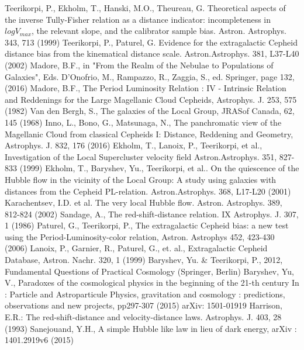 \begin{thebibliography}{}
Teerikorpi, P., Ekholm, T., Hanski, M.O., Theureau, G. Theoretical aspects of the inverse Tully-Fisher relation as a distance indicator: incompleteness in $logV_{max}$, the relevant slope, and the calibrator sample bias. Astron. Astrophys. 343, 713 (1999)
Teerikorpi, P., Paturel, G. Evidence for the extragalactic Cepheid distance bias from the kinematical distance scale. Astron.Astrophys. 381, L37-L40 (2002)
Madore, B.F., in "From the Realm of the Nebulae to Populations of Galaxies", Eds. D'Onofrio, M., Rampazzo, R., Zaggia, S., ed. Springer, page 132, (2016)
Madore, B.F., The Period Luminosity Relation : IV - Intrinsic Relation and Reddenings for the Large Magellanic Cloud Cepheids, Astrophys. J. 253, 575 (1982)
Van den Bergh, S., The galaxies of the Local Group, JRASof Canada, 62, 145 (1968)
Inno, L., Bono, G., Matsunaga, N., The panchromatic view of the Magellanic Cloud from classical Cepheids I: Distance, Reddening and Geometry, Astrophys. J. 832, 176 (2016)
Ekholm, T., Lanoix, P., Teerikorpi, et al., Investigation of the Local Supercluster velocity field Astron.Astrophys. 351, 827-833 (1999)   
Ekholm, T., Baryshev, Yu., Teerikorpi, et al.. On the quiescence of the Hubble flow in the vicinity of the Local Group: A study using galaxies with distances from the Cepheid PL-relation. Astron.Astrophys. 368, L17-L20 (2001)
Karachentsev, I.D. et al. The very local Hubble flow. Astron. Astrophys. 389, 812-824 (2002)
Sandage, A., The red-shift-distance relation. IX Astrophys. J. 307, 1  (1986)
Paturel, G., Teerikorpi, P., The extragalactic Cepheid bias: a new test using the Period-Luminosity-color relation, Astron. Astrophys 452, 423-430 (2006)
Lanoix, P., Garnier, R., Paturel, G., et. al., Extragalactic Cepheid Database, Astron. Nachr. 320, 1 (1999)
Baryshev, Yu. \& Teerikorpi, P., 2012, Fundamental Questions of Practical Cosmology (Springer, Berlin)
 Baryshev, Yu, V., Paradoxes of the cosmological physics in the beginning of the 21-th  century In : Particle and Astroparticule Physics, gravitation and cosmology : predictions, observations and new projects, pp297-307 (2015) arXiv: 1501-01919
 Harrison, E.R.: The red-shift-distance and velocity-distance laws. Astrophys. J. 403, 28 (1993)
Sanejouand, Y.H., A simple Hubble like law in lieu of dark energy, arXiv : 1401.2919v6 (2015)

\end{thebibliography}
